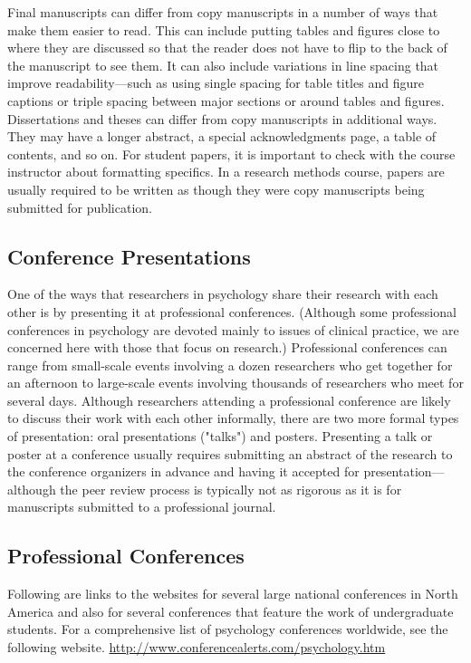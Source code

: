 Final manuscripts can differ from copy manuscripts in a number of ways that make them easier to read. This can include putting tables and figures close to where they are discussed so that the reader does not have to flip to the back of the manuscript to see them. It can also include variations in line spacing that improve readability---such as using single spacing for table titles and figure captions or triple spacing between major sections or around tables and figures. Dissertations and theses can differ from copy manuscripts in additional ways. They may have a longer abstract, a special acknowledgments page, a table of contents, and so on. For student papers, it is important to check with the course instructor about formatting specifics. In a research methods course, papers are usually required to be written as though they were copy manuscripts being submitted for publication.

\subsection{Conference Presentations}

One of the ways that researchers in psychology share their research with each other is by presenting it at professional conferences. (Although some professional conferences in psychology are devoted mainly to issues of clinical practice, we are concerned here with those that focus on research.) Professional conferences can range from small-scale events involving a dozen researchers who get together for an afternoon to large-scale events involving thousands of researchers who meet for several days. Although researchers attending a professional conference are likely to discuss their work with each other informally, there are two more formal types of presentation: oral presentations ("talks") and posters. Presenting a talk or poster at a conference usually requires submitting an abstract of the research to the conference organizers in advance and having it accepted for presentation---although the peer review process is typically not as rigorous as it is for manuscripts submitted to a professional journal.

\subsection{Professional Conferences}

Following are links to the websites for several large national conferences in North America and also for several conferences that feature the work of undergraduate students. For a comprehensive list of psychology conferences worldwide, see the following website.
\url{http://www.conferencealerts.com/psychology.htm}

